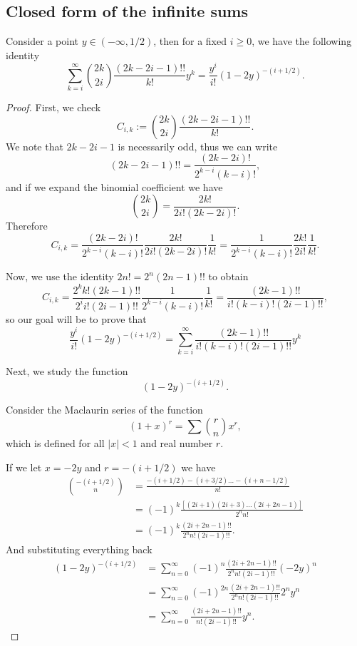 \subsection{Closed form of the infinite sums}
\begin{lemma}\label{lemma:ith-inf-series}
    Consider a point $y \in (-\infty, 1/2)$, then for a fixed $i \geq 0$, we have the following identity
    \[
        \sum_{k=i}^\infty \binom{2k}{2i}\frac{(2k-2i-1)!!}{k!} y^{k} = \frac{y^i}{i!}(1-2y)^{-(i+1/2)}.
    \]
\end{lemma}
\begin{proof}

    First, we check
    \[
        C_{i,k} := \binom{2k}{2i}\frac{(2k-2i-1)!!}{k!}.
    \]
    We note that $2k-2i-1$ is necessarily odd, thus we can write
    \[
        (2k-2i-1)!! = \frac{(2k-2i)!}{2^{k-i}(k-i)!},
    \]
    and if we expand the binomial coefficient we have
    \[
        \binom{2k}{2i} = \frac{2k!}{2i!(2k-2i)!}.
    \]
    Therefore
    \[
        C_{i,k} = \frac{(2k-2i)!}{2^{k-i}(k-i)!}\frac{2k!}{2i!(2k-2i)!}\frac{1}{k!} = \frac{1}{2^{k-i}(k-i)!}\frac{2k!}{2i!}\frac{1}{k!}.
    \]

    Now, we use the identity $2n! = 2^n(2n-1)!!$ to obtain
    \[
        C_{i,k} = \frac{2^kk!(2k-1)!!}{2^ii!(2i-1)!!}\frac{1}{2^{k-i}(k-i)!}\frac{1}{k!} = \frac{(2k-1)!!}{i!(k-i)!(2i-1)!!},
    \]
    so our goal will be to prove that
    \begin{equation}\label{eq:ith-inf-sum}
        \frac{y^i}{i!}(1-2y)^{-(i+1/2)} = \sum_{k=i}^\infty \frac{(2k-1)!!}{i!(k-i)!(2i-1)!!} y^{k}         
    \end{equation}

    Next, we study the function
    \[
        (1-2y)^{-(i+1/2)}.
    \]

    Consider the Maclaurin series of the function
    \[
        (1+x)^r = \sum \binom{r}{n} x^r,
    \]
    which is defined for all $|x|<1$ and real number $r.$
    
    If we let $x = -2y$ and $r = -(i+1/2)$ we have
    \begin{align*}
        \binom{-(i+1/2)}{n} &= \frac{-(i+1/2)-(i+3/2)\dots-(i+ n - 1/2)}{n!} \\
        &= (-1)^k\frac{[(2i+1)(2i+3)\dots (2i+2n-1)]}{2^n n!} \\
        &= (-1)^k\frac{(2i+2n-1)!!}{2^n n!(2i-1)!!}.
    \end{align*}
    And substituting everything back
    \begin{align*}
        (1-2y)^{-(i+1/2)} &= \sum_{n = 0}^\infty (-1)^n\frac{(2i+2n-1)!!}{2^n n!(2i-1)!!} (-2y)^n\\
        &= \sum_{n=0}^\infty (-1)^{2n}\frac{(2i+2n-1)!!}{2^n n!(2i-1)!!} 2^n y^n\\
        &=\sum_{n=0}^\infty \frac{(2i+2n-1)!!}{n!(2i-1)!!}y^n.
    \end{align*}


\end{proof}
